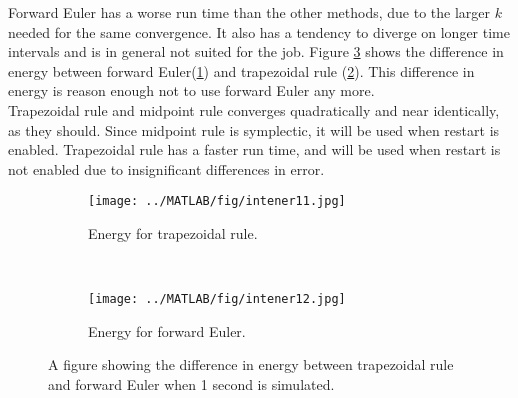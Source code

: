 Forward Euler has a worse run time than the other methods, due to the larger $k$ needed for the same convergence. It also has a tendency to diverge on longer time intervals and is in general not suited for the job. Figure \ref{fig:forwardenergy} shows the difference in energy between forward Euler(\ref{fig:fe1}) and trapezoidal rule (\ref{fig:fe2}). This difference in energy is reason enough not to use forward Euler any more.\\

Trapezoidal rule and midpoint rule converges quadratically and near identically, as they should. Since midpoint rule is symplectic, it will be used when restart is enabled. Trapezoidal rule has a faster run time, and will be used when restart is not enabled due to insignificant differences in error.%

\begin{figure}[H]
        \centering
        \begin{subfigure}[b]{0.45\textwidth}
                \texttt{[image: ../MATLAB/fig/intener11.jpg]}
                \caption{ Energy for trapezoidal rule. }
                \label{fig:fe1}
        \end{subfigure}
        ~
        \begin{subfigure}[b]{0.45\textwidth}
                \texttt{[image: ../MATLAB/fig/intener12.jpg]}
                \caption{ Energy for forward Euler. }  
				\label{fig:fe2}
        \end{subfigure}                
\caption{ A figure showing the difference in energy between trapezoidal rule and forward Euler when 1 second is simulated. }
\label{fig:forwardenergy}
\end{figure}

